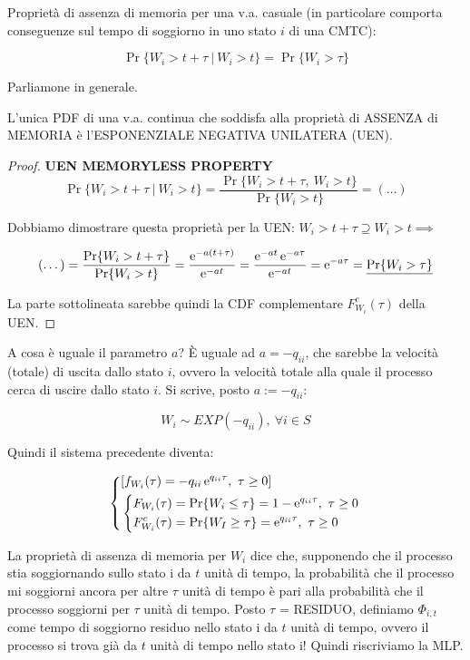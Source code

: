 Proprietà di assenza di memoria per una v.a. casuale (in particolare comporta conseguenze sul tempo di soggiorno in uno stato $i$ di una CMTC):

\[
	\Pr\{W_i > t+\tau\ |\ W_i > t\} = \Pr\{W_i > \tau\}
\]	
	
Parliamone in generale.

\begin{thrm}
L'unica PDF di una v.a. continua che soddisfa alla proprietà di ASSENZA di MEMORIA è l'ESPONENZIALE NEGATIVA UNILATERA (UEN). 
\end{thrm}

\begin{proof}{\textbf{UEN MEMORYLESS PROPERTY}}
\[
	\Pr\{W_i > t+\tau\ |\ W_i > t\} = \frac{\Pr\{W_i > t+\tau,\ W_i > t\}}{\Pr\{W_i > t\}} =(\dots)
\]

Dobbiamo dimostrare questa proprietà per la UEN: $W_i>t+\tau\supseteq W_i>t \implies$

\[ 	
	(\dots) = \frac{\Pr\{W_i > t+\tau\}}{\Pr\{W_i > t\}} = \frac{\mathop{}\!\mathrm{e}^{-a(t+\tau)}}{\mathop{}\!\mathrm{e}^{-at}} = \frac{\mathop{}\!\mathrm{e}^{-at}\mathop{}\!\mathrm{e}^{-a\tau}}{\mathop{}\!\mathrm{e}^{-at}} = \mathop{}\!\mathrm{e}^{-a\tau} = \underline{\Pr\{W_i > \tau\}}
\]

La parte sottolineata sarebbe quindi la CDF complementare $F_{W_i}^c(\tau)$ della UEN.
\end{proof}

A cosa è uguale il parametro $a$? \`E uguale ad $a = -q_{ii}$, che sarebbe la velocità (totale) di uscita dallo stato $i$, ovvero la velocità totale alla quale il processo cerca di uscire dallo stato $i$. Si scrive, posto $a := -q_{ii}$:

\[
	W_i \sim EXP(-q_{ii}),\ \forall i\in S
\]

Quindi il sistema precedente diventa:

\[
	\left\{
	\begin{aligned}
	&[f_{W_i}(\tau) = -q_{ii}\e^{q_{ii}\tau},\ \tau \geq 0]\\
	&\left\{
	\begin{aligned}
	&F_{W_i}(\tau) = \Pr\{W_i\leq\tau\} = 1-\e^{q_{ii}\tau},\ \tau\geq 0\\
	&F_{W_i}^c(\tau) = \Pr\{W_I\geq\tau\} = \e^{q_{ii}\tau},\ \tau\geq 0
	\end{aligned}
	\right.
	\end{aligned}
	\right.
\]

La proprietà di assenza di memoria per $W_i$ dice che, supponendo che il processo stia soggiornando sullo stato i da $t$ unità di tempo, la probabilità che il processo mi soggiorni ancora per altre $\tau$ unità di tempo è pari alla probabilità che il processo soggiorni per $\tau$ unità di tempo. Posto $\tau$ = RESIDUO, definiamo $\Phi_{i,t}$ come tempo di soggiorno residuo nello stato i da $t$ unità di tempo, ovvero il processo si trova già da $t$ unità di tempo nello stato i! Quindi riscriviamo la MLP.

